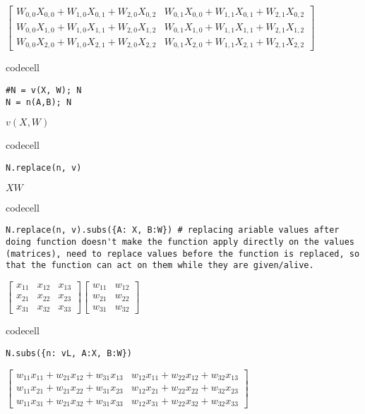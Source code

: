 $\displaystyle \left[\begin{array}{cc}W_{0, 0} X_{0, 0} + W_{1, 0} X_{0, 1} + W_{2, 0} X_{0, 2} & W_{0, 1} X_{0, 0} + W_{1, 1} X_{0, 1} + W_{2, 1} X_{0, 2}\\W_{0, 0} X_{1, 0} + W_{1, 0} X_{1, 1} + W_{2, 0} X_{1, 2} & W_{0, 1} X_{1, 0} + W_{1, 1} X_{1, 1} + W_{2, 1} X_{1, 2}\\W_{0, 0} X_{2, 0} + W_{1, 0} X_{2, 1} + W_{2, 0} X_{2, 2} & W_{0, 1} X_{2, 0} + W_{1, 1} X_{2, 1} + W_{2, 1} X_{2, 2}\end{array}\right]$

codecell

\begin{verbatim}
#N = v(X, W); N
N = n(A,B); N
\end{verbatim}

$\displaystyle v{\left(X,W \right)}$

codecell

\begin{verbatim}
N.replace(n, v)
\end{verbatim}

$\displaystyle X W$

codecell

\begin{verbatim}
N.replace(n, v).subs({A: X, B:W}) # replacing ariable values after doing function doesn't make the function apply directly on the values (matrices), need to replace values before the function is replaced, so that the function can act on them while they are given/alive.
\end{verbatim}

$\displaystyle \left[\begin{matrix}x_{11} & x_{12} & x_{13}\\x_{21} & x_{22} & x_{23}\\x_{31} & x_{32} & x_{33}\end{matrix}\right] \left[\begin{matrix}w_{11} & w_{12}\\w_{21} & w_{22}\\w_{31} & w_{32}\end{matrix}\right]$

codecell

\begin{verbatim}
N.subs({n: vL, A:X, B:W})
\end{verbatim}

$\displaystyle \left[\begin{matrix}w_{11} x_{11} + w_{21} x_{12} + w_{31} x_{13} & w_{12} x_{11} + w_{22} x_{12} + w_{32} x_{13}\\w_{11} x_{21} + w_{21} x_{22} + w_{31} x_{23} & w_{12} x_{21} + w_{22} x_{22} + w_{32} x_{23}\\w_{11} x_{31} + w_{21} x_{32} + w_{31} x_{33} & w_{12} x_{31} + w_{22} x_{32} + w_{32} x_{33}\end{matrix}\right]$

